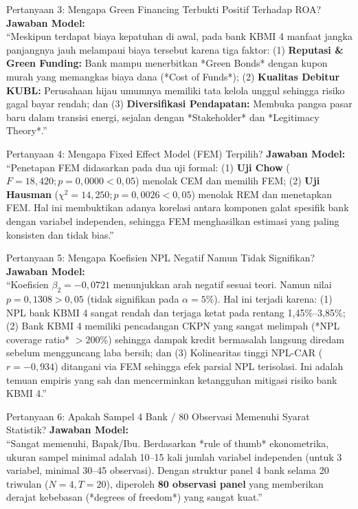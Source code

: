 \documentclass[11pt,a4paper]{article}
\begin{document}
\begin{qnabox}{Pertanyaan 3: Mengapa Green Financing Terbukti Positif Terhadap ROA?}
\textbf{Jawaban Model:}\\
``Meskipun terdapat biaya kepatuhan di awal, pada bank KBMI 4 manfaat jangka panjangnya jauh melampaui biaya tersebut karena tiga faktor: (1) \textbf{Reputasi \& Green Funding:} Bank mampu menerbitkan *Green Bonds* dengan kupon murah yang memangkas biaya dana (*Cost of Funds*); (2) \textbf{Kualitas Debitur KUBL:} Perusahaan hijau umumnya memiliki tata kelola unggul sehingga risiko gagal bayar rendah; dan (3) \textbf{Diversifikasi Pendapatan:} Membuka pangsa pasar baru dalam transisi energi, sejalan dengan *Stakeholder* dan *Legitimacy Theory*.''
\end{qnabox}

\begin{qnabox}{Pertanyaan 4: Mengapa Fixed Effect Model (FEM) Terpilih?}
\textbf{Jawaban Model:}\\
``Penetapan FEM didasarkan pada dua uji formal: (1) \textbf{Uji Chow} ($F = 18{,}420; p = 0{,}0000 < 0{,}05$) menolak CEM dan memilih FEM; (2) \textbf{Uji Hausman} ($\chi^2 = 14{,}250; p = 0{,}0026 < 0{,}05$) menolak REM dan menetapkan FEM. Hal ini membuktikan adanya korelasi antara komponen galat spesifik bank dengan variabel independen, sehingga FEM menghasilkan estimasi yang paling konsisten dan tidak bias.''
\end{qnabox}

\begin{qnabox}{Pertanyaan 5: Mengapa Koefisien NPL Negatif Namun Tidak Signifikan?}
\textbf{Jawaban Model:}\\
``Koefisien $\beta_2 = -0{,}0721$ menunjukkan arah negatif sesuai teori. Namun nilai $p = 0{,}1308 > 0{,}05$ (tidak signifikan pada $\alpha = 5\%$). Hal ini terjadi karena: (1) NPL bank KBMI 4 sangat rendah dan terjaga ketat pada rentang 1,45\%--3,85\%; (2) Bank KBMI 4 memiliki pencadangan CKPN yang sangat melimpah (*NPL coverage ratio* $> 200\%$) sehingga dampak kredit bermasalah langsung diredam sebelum mengguncang laba bersih; dan (3) Kolinearitas tinggi NPL-CAR ($r = -0{,}934$) ditangani via FEM sehingga efek parsial NPL terisolasi. Ini adalah temuan empiris yang sah dan mencerminkan ketangguhan mitigasi risiko bank KBMI 4.''
\end{qnabox}

\begin{qnabox}{Pertanyaan 6: Apakah Sampel 4 Bank / 80 Observasi Memenuhi Syarat Statistik?}
\textbf{Jawaban Model:}\\
``Sangat memenuhi, Bapak/Ibu. Berdasarkan *rule of thumb* ekonometrika, ukuran sampel minimal adalah 10--15 kali jumlah variabel independen (untuk 3 variabel, minimal 30--45 observasi). Dengan struktur panel 4 bank selama 20 triwulan ($N=4, T=20$), diperoleh \textbf{80 observasi panel} yang memberikan derajat kebebasan (*degrees of freedom*) yang sangat kuat.''
\end{qnabox}
\end{document}
